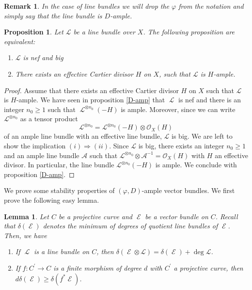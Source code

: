 \documentclass[11pt]{amsart}
\numberwithin{subsection}{section}
\numberwithin{figure}{section}
\numberwithin{table}{section}
\theoremstyle{1}
\newtheorem{lemma}[theorem]{Lemma}
\newtheorem{proposition}[theorem]{Proposition}
\theoremstyle{2}
\newtheorem{rmrk}[theorem]{Remark}
\DeclareMathOperator{\Lc}{\mathcal{L}}
\DeclareMathOperator{\E}{\mathcal{E}}
\begin{document}
\begin{rmrk}
In the case of line bundles we will drop the $\varphi$ from the notation and simply say that the line bundle is $D$-ample.
\end{rmrk}
\begin{proposition}\label{prop20}
Let $\mathcal{L}$ be a line bundle over $X$. The following proposition are equivalent:
\begin{enumerate}
\item $\mathcal{L}$ is nef and big
\item There exists an effective Cartier divisor $H$ on $X$, such that $\mathcal{L}$ is $H$-ample.
\end{enumerate}
\end{proposition}
\begin{proof}
Assume that there exists an effective Cartier divisor $H$ on $X$ such that $\mathcal{L}$ is $H$-ample. We have seen in proposition \ref{D-amp} that $\Lc$ is nef and there is an integer $n_0 \geq 1$ such that $\Lc^{\otimes n_0}(-H)$ is ample. Moreover, since we can write $\mathcal{L}^{\otimes n_0}$ as a tensor product
\begin{equation*}
\mathcal{L}^{\otimes n_0} = \mathcal{L}^{\otimes n_0}(-H) \otimes \mathcal{O}_X(H)
\end{equation*}
of an ample line bundle with an effective line bundle, $\mathcal{L}$ is big. We are left to show the implication $(i) \Rightarrow (ii)$. Since $\mathcal{L}$ is big, there exists an integer $n_0 \geq 1$ and an ample line bundle $\mathcal{A}$ such that $\mathcal{L}^{\otimes n_0}\otimes \mathcal{A}^{-1} = \mathcal{O}_X(H)$ with $H$ an effective divisor. In particular, the line bundle $\mathcal{L}^{\otimes n_0}(-H)$ is ample. We conclude with proposition \ref{D-amp}.
\end{proof}
We prove some stability properties of $(\varphi,D)$-ample vector bundles. We first prove the following easy lemma.
\begin{lemma}\label{lem_delta}
Let $C$ be a projective curve and $\E$ be a vector bundle on $C$. Recall that $\delta(\E)$ denotes the minimum of degrees of quotient line bundles of $\E$. Then, we have
\begin{enumerate}
\item If $\Lc$ is a line bundle on $C$, then $\delta(\E \otimes \mathcal{L}) = \delta(\E) + \deg \mathcal{L}$.
\item If $f : C^\prime \rightarrow C$ is a finite morphism of degree $d$ with $C^\prime$ a projective curve, then $d\delta(\E) \geq \delta(f^*\E)$.
\end{enumerate}
\end{lemma}
\end{document}
